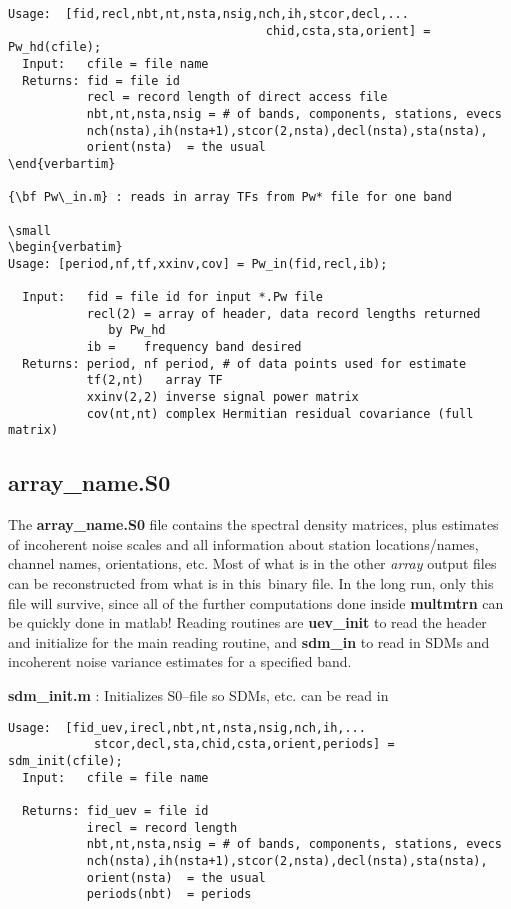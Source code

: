 \small
\begin{verbatim}
Usage:  [fid,recl,nbt,nt,nsta,nsig,nch,ih,stcor,decl,...
                                    chid,csta,sta,orient] = Pw_hd(cfile);
  Input:   cfile = file name
  Returns: fid = file id
           recl = record length of direct access file
           nbt,nt,nsta,nsig = # of bands, components, stations, evecs
           nch(nsta),ih(nsta+1),stcor(2,nsta),decl(nsta),sta(nsta),
           orient(nsta)  = the usual
\end{verbartim}

{\bf Pw\_in.m} : reads in array TFs from Pw* file for one band

\small
\begin{verbatim}
Usage: [period,nf,tf,xxinv,cov] = Pw_in(fid,recl,ib);

  Input:   fid = file id for input *.Pw file 
           recl(2) = array of header, data record lengths returned
              by Pw_hd
           ib =    frequency band desired
  Returns: period, nf period, # of data points used for estimate
           tf(2,nt)   array TF
           xxinv(2,2) inverse signal power matrix
           cov(nt,nt) complex Hermitian residual covariance (full matrix)
\end{verbatim}
\normalsize

\subsection{array\_name.S0}

The {\bf array\_name.S0} file contains the spectral density matrices, plus
estimates of incoherent noise scales and all information about station
locations/names, channel names, orientations, etc.  Most of what is in the
other {\it array} output files can be reconstructed from what is in this\
binary file.  In the long run, only this file will survive, since all of the
further computations done inside {\bf multmtrn} can be quickly done in matlab!
Reading routines are {\bf uev\_init} to read the header and initialize
for the main reading routine, and
{\bf sdm\_in} to read in SDMs and incoherent noise variance estimates
for a specified band.

{\bf sdm\_init.m}  : Initializes S0--file so SDMs, etc. can be read in

\small
\begin{verbatim}
Usage:  [fid_uev,irecl,nbt,nt,nsta,nsig,nch,ih,...
            stcor,decl,sta,chid,csta,orient,periods] = sdm_init(cfile);
  Input:   cfile = file name
 
  Returns: fid_uev = file id
           irecl = record length
           nbt,nt,nsta,nsig = # of bands, components, stations, evecs
           nch(nsta),ih(nsta+1),stcor(2,nsta),decl(nsta),sta(nsta),
           orient(nsta)  = the usual
           periods(nbt)  = periods
\end{verbatim}
\normalsize

